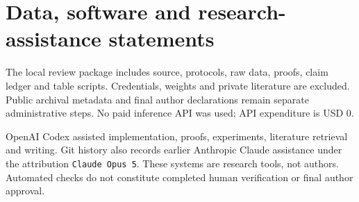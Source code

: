 \documentclass[preprint,12pt,a4paper]{elsarticle}
\begin{document}
\section*{Data, software and research-assistance statements}
The local review package includes source, protocols, raw data, proofs, claim
ledger and table scripts. Credentials, weights and private literature are
excluded. Public archival metadata and final author declarations remain
separate administrative steps. No paid inference API was used; API expenditure
is USD 0.

OpenAI Codex assisted implementation, proofs, experiments, literature retrieval
and writing. Git history also records earlier Anthropic Claude assistance
under the attribution \texttt{Claude Opus 5}. These systems are research tools,
not authors. Automated checks do not constitute completed human verification
or final author approval.


\end{document}
